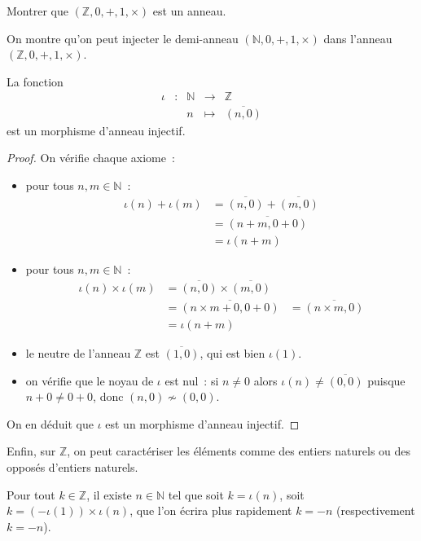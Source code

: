 \begin{exercise}
  Montrer que $(\mathbb Z,0,+,1,\times)$ est un anneau.
\end{exercise}

On montre qu'on peut injecter le demi-anneau $(\mathbb N,0,+,1,\times)$ dans
l'anneau $(\mathbb Z,0,+,1,\times)$.

\begin{proposition}
  La fonction
  \[\begin{array}{ccccc}
  \iota & : & \mathbb N & \longrightarrow & \mathbb Z\\
  & & n & \longmapsto & \overline{(n,0)}
  \end{array}\]
  est un morphisme d'anneau injectif.
\end{proposition}

\begin{proof}
  On vérifie chaque axiome~:
  \begin{itemize}
  \item pour tous $n,m\in\mathbb N$~:
    \begin{align*}
      \iota(n) + \iota(m) &= \overline{(n,0)} + \overline{(m,0)}\\
      &= \overline{(n+m,0+0)}\\
      &= \iota(n+m)
    \end{align*}
  \item pour tous $n,m\in\mathbb N$~:
    \begin{align*}
      \iota(n)\times \iota(m) &= \overline{(n,0)} \times \overline{(m,0)}\\
      &= \overline{(n \times m + 0, 0 + 0)}
      &= \overline{(n\times m,0)}\\
      &= \iota(n+m)
    \end{align*}
  \item le neutre de l'anneau $\mathbb Z$ est $\overline{(1,0)}$, qui est bien
    $\iota(1)$.
  \item on vérifie que le noyau de $\iota$ est nul~: si $n\neq 0$ alors
    $\iota(n) \neq \overline{(0,0)}$ puisque $n + 0 \neq 0 + 0$, donc
    $(n,0)\nsim (0,0)$.
  \end{itemize}
  On en déduit que $\iota$ est un morphisme d'anneau injectif.
\end{proof}

Enfin, sur $\mathbb Z$, on peut caractériser les éléments comme des entiers
naturels ou des opposés d'entiers naturels.

\begin{proposition}
  Pour tout $k \in \mathbb Z$, il existe $n \in \mathbb N$ tel que soit
  $k = \iota(n)$, soit $k = (-\iota(1)) \times \iota(n)$, que l'on écrira
  plus rapidement $k = -n$ (respectivement $k = -n$).
\end{proposition}

